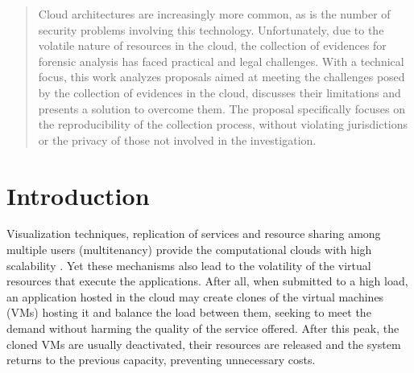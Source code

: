 \documentclass[conference]{IEEEtran}
\begin{document}
\maketitle

\begin{abstract}
Cloud architectures are increasingly more common, as is the number of security problems involving this technology. 
%
Unfortunately, due to the volatile nature of resources in the cloud, the collection of evidences for forensic analysis has faced practical and legal challenges.
%
With a technical focus, this work analyzes proposals aimed at meeting the challenges posed by the collection of evidences in the cloud, discusses their limitations and presents a solution to overcome them.
%
The proposal specifically focuses on the reproducibility of the collection process, without violating jurisdictions or the privacy of those not involved in the investigation.

\end{abstract}





%
\IEEEpeerreviewmaketitle

\section{Introduction}

%
Visualization techniques, replication of services and resource sharing among multiple users (multitenancy) provide the computational clouds with high scalability \cite{Morsy_Cloud_Security:2010}.
%
Yet these mechanisms also lead to the volatility of the virtual resources that execute the applications.
%
After all, when submitted to a high load, an application hosted in the cloud may create clones of the virtual machines (VMs) hosting it and balance the load between them, seeking to meet the demand without harming the quality of the service offered. 
%
After this peak, the cloned VMs are usually deactivated, their resources are released and the system returns to the previous capacity, preventing unnecessary costs.
\end{document}
